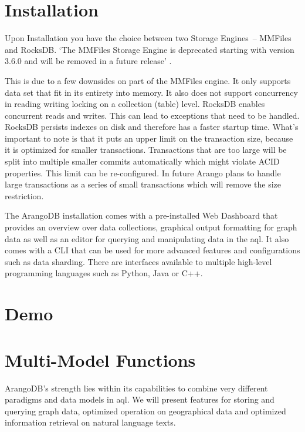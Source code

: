 \section{Installation}

Upon Installation you have the choice between two Storage Engines – MMFiles and RocksDB. `The MMFiles Storage Engine is deprecated starting with version 3.6.0 and will be removed in a future release' \cite{ArangoDeprecated}.

This is due to a few downsides on part of the MMFiles engine. It only supports data set that fit in its entirety into memory. It also does not support concurrency in reading writing locking on a collection (table) level. RocksDB enables concurrent reads and writes. This can lead to exceptions that need to be handled. RocksDB persists indexes on disk and therefore has a faster startup time. What's important to note is that it puts an upper limit on the transaction size, because it is optimized for smaller transactions. Transactions that are too large will be split into multiple smaller commits automatically which might violate ACID properties. This limit can be re-configured. In future Arango plans to handle large transactions as a series of small transactions which will remove the size restriction. \cite{MMvsRocks}

The ArangoDB installation comes with a pre-installed Web Dashboard that provides an overview over data collections, graphical output formatting for graph data as well as an editor for querying and manipulating data in the \gls{aql}. It also comes with a CLI that can be used for more advanced features and configurations such as data sharding. There are interfaces available to multiple high-level programming languages such as Python, Java or C++. 

\section{Demo}

\section{Multi-Model Functions}

ArangoDB's strength lies within its capabilities to combine very different paradigms and data models in \gls{aql}. We will present features for storing and querying graph data, optimized operation on geographical data and optimized information retrieval on natural language texts.

